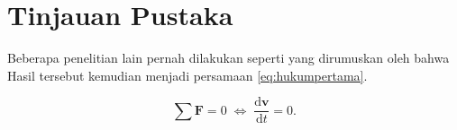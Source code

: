 \section{Tinjauan Pustaka}
\label{sec:tinjauanpustaka}

Beberapa penelitian lain pernah dilakukan seperti yang dirumuskan oleh \citet{newton1687} bahwa \lipsum[5]
Hasil tersebut kemudian menjadi persamaan \ref{eq:hukumpertama}.

\begin{equation}
  \label{eq:hukumpertama}
  \sum \mathbf{F} = 0\; \Leftrightarrow\; \frac{\mathrm{d} \mathbf{v} }{\mathrm{d}t} = 0.
\end{equation}

\lipsum[6-7]